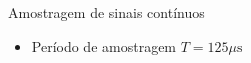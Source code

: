 \documentclass[
size=17pt,
paper=smartboard,
mode=present,
display=slidesnotes,
style=sailor,
nopagebreaks,
blackslide,
fleqn]{powerdot}
\begin{document}
\begin{slide}[toc=]{Amostragem de sinais contínuos}
\begin{itemize}
 \item Período de amostragem $T=125 \mu \text{s}$\\
    \begin{center}
    \end{center}
\end{itemize}
\end{slide}
\end{document}
